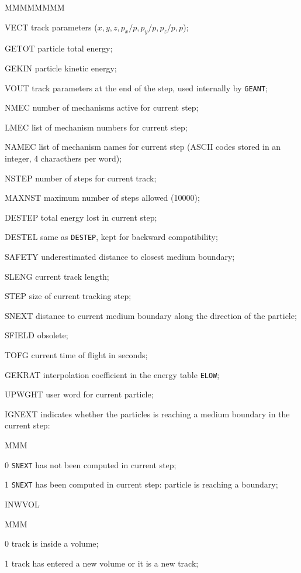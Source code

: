 \begin{DLtt}{MMMMMMMM}
\item[VECT] track parameters ($x,y,z,p_x/p,p_y/p,p_z/p,p$);
\item[GETOT]particle total energy;
\item[GEKIN]particle kinetic energy;
\item[VOUT]track parameters at the end of the step, used internally by
{\tt GEANT};
\item[NMEC]number of mechanisms active for current step;
\item[LMEC]list of mechanism numbers for current step;
\item[NAMEC]list of mechanism names for current step
(ASCII codes stored in an integer, 4 characthers per word);
\item[NSTEP]number of steps for current track;
\item[MAXNST]maximum number of steps allowed (10000);
\item[DESTEP]total energy lost in current step;
\item[DESTEL]same as {\tt DESTEP}, kept for backward compatibility;
\item[SAFETY]underestimated distance to closest medium boundary;
\item[SLENG]current track length;
\item[STEP] size of current tracking step;
\item[SNEXT]distance to current medium boundary along the direction of
the particle;
\item[SFIELD]obsolete;
\item[TOFG]current time of flight in seconds;
\item[GEKRAT]interpolation coefficient in the energy table {\tt ELOW};
\item[UPWGHT]user word for current particle;
\item[IGNEXT] indicates whether the particles is reaching a medium
boundary in the current step:
\begin{DLtt}{MMM}
\item[0]{\tt SNEXT} has not been computed in current step;
\item[1]{\tt SNEXT} has been computed in current step: particle is
reaching a boundary;
\end{DLtt}
\item[INWVOL]
\begin{DLtt}{MMM}
\item[0]track is inside a volume;
\item[1]track has entered a new volume or it is a new track;

\end{DLtt}
\end{DLtt}
